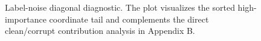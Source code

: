 \begin{figure}[H]
\centering

\caption[Label-noise diagonal diagnostic]{Label-noise diagonal diagnostic. The plot visualizes the sorted high-importance coordinate tail and complements the direct clean/corrupt contribution analysis in Appendix B.}
\label{fig:contamination-diagonal-spectra}
\end{figure}
